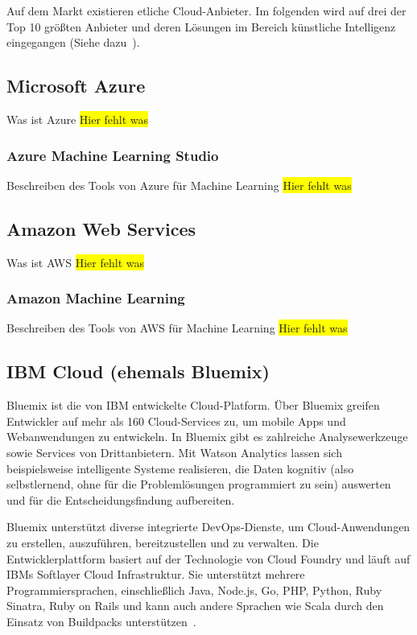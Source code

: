 Auf dem Markt existieren etliche Cloud-Anbieter. Im folgenden wird auf drei der Top 10 größten Anbieter und deren Lösungen
im Bereich künstliche Intelligenz eingegangen (Siehe dazu~\cite{online_grundlagen_cloud}).

\subsection{Microsoft Azure}
Was ist Azure
\colorbox{yellow}{Hier fehlt was}

\subsubsection{Azure Machine Learning Studio}
Beschreiben des Tools von Azure für Machine Learning
\colorbox{yellow}{Hier fehlt was}

\subsection{Amazon Web Services}
Was ist AWS
\colorbox{yellow}{Hier fehlt was}

\subsubsection{Amazon Machine Learning}
Beschreiben des Tools von AWS für Machine Learning
\colorbox{yellow}{Hier fehlt was}

\subsection{IBM Cloud (ehemals Bluemix)}
Bluemix ist die von IBM entwickelte Cloud-Platform. Über Bluemix greifen Entwickler auf mehr als 160 Cloud-Services zu,
um mobile Apps und Webanwendungen zu entwickeln. In Bluemix gibt es zahlreiche Analysewerkzeuge sowie Services von
Drittanbietern. Mit Watson Analytics lassen sich beispielsweise intelligente Systeme realisieren, die Daten kognitiv
(also selbstlernend, ohne für die Problemlösungen programmiert zu sein) auswerten und für die Entscheidungsfindung
aufbereiten.

Bluemix unterstützt diverse integrierte DevOps-Dienste, um Cloud-Anwendungen zu erstellen, auszuführen, bereitzustellen
und zu verwalten. Die Entwicklerplattform basiert auf der Technologie von Cloud Foundry und läuft auf IBMs
Softlayer Cloud Infrastruktur. Sie unterstützt mehrere Programmiersprachen, einschließlich Java, Node.js, Go, PHP,
Python, Ruby Sinatra, Ruby on Rails und kann auch andere Sprachen wie Scala durch den Einsatz von Buildpacks
unterstützen~\cite{online_grundlagen_bluemix}.


